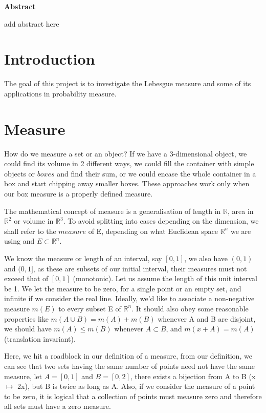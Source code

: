 \documentclass{article}
\begin{document}
\newpage

\begin{center}
    {\Large\bfseries\noindent Abstract}
\end{center}

add abstract here
\newpage

\begin{center}
    \tableofcontents
\end{center}

\newpage

\section{Introduction}
The goal of this project is to investigate the Lebesgue measure and some of its applications in probability measure. 

\section{Measure}

How do we measure a set or an object? If we have a 3-dimensional object, we could find its volume in 2 different ways, we could fill the container with simple objects or $boxes$ and find their sum, or we could encase the whole container in a box and start chipping away smaller boxes. These approaches work only when our box measure is a properly defined measure.\medskip

The mathematical concept of measure is a generalisation of length in $\mathbb{R}$, area in $\mathbb{R}^2$ or volume in $\mathbb{R}^3$. To avoid splitting into cases depending on the dimension, we shall refer to the $measure$ of E, depending on what Euclidean space $\mathbb{R}^n$ we are using and $E \subset \mathbb{R}^n$.\medskip

We know the measure or length of an interval, say $[0,1]$, we also have $(0,1)$ and $(0,1]$, as these are subsets of our initial interval, their measures must not exceed that of $[0,1]$ (monotonic). Let us assume the length of this unit interval be 1. We let the measure to be zero, for a single point or an empty set, and infinite if we consider the real line. Ideally, we'd like to associate a non-negative measure $m(E)$ to every subset E of $\mathbb{R}^n$. It should also obey some reasonable properties like $m(A \cup B) = m(A) + m(B)$ whenever A and B are disjoint, we should have $m(A) \leq m(B)$ whenever $A \subset B$, and $m(x+A)=m(A)$ (translation invariant).\medskip

Here, we hit a roadblock in our definition of a measure, from our definition, we can see that two sets having the same number of points need not have the same measure, let $A=[0,1]$ and $B=[0,2]$, there exists a bijection from A to B (x $\mapsto$ 2x), but B is twice as long as A. Also, if we consider the measure of a point to be zero, it is logical that a collection of points must measure zero and therefore all sets must have a zero measure.\medskip
 
\end{document}
